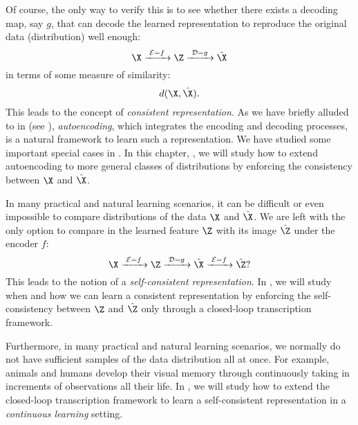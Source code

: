 \documentclass[../../book-main.tex]{subfiles}
\begin{document}
Of course, the only way to verify this is to see whether there exists a decoding map, say $g$, that can decode the learned representation to reproduce the original data (distribution) well enough:
\begin{equation}
  \X
  \xrightarrow{\hspace{1mm} \mathcal{E} = f \hspace{1mm}} \Z
  \xrightarrow{\hspace{1mm} \mathcal{D} = g \hspace{1mm}} \hat{\X}
\end{equation}
in terms of some measure of similarity:
\begin{equation}
  d(\X, \hat \X).
\end{equation}
This leads to the concept of {\em consistent representation}. As we have briefly alluded to in
 (see ), {\em autoencoding}, which integrates the
encoding and decoding processes, is a natural framework to learn such a representation. We have studied some important special cases in . In
this chapter, , we will study how to extend autoencoding to more general classes of distributions by enforcing the consistency between $\X$ and $\hat \X$.

In many practical and natural learning scenarios, it can be difficult or even impossible to compare distributions of the data $\X$ and $\hat \X$. We are left with the only option to compare in the learned feature $\Z$ with its image $\hat \Z$ under the encoder $f$: 
\begin{equation}
 \X
\xrightarrow{\hspace{1mm} \mathcal{E} = f \hspace{1mm}} \Z  \xrightarrow{\hspace{1mm} \mathcal{D} = g \hspace{1mm}} \hat{\X} \xrightarrow{\hspace{1mm} \mathcal{E} = f \hspace{1mm}} \hat \Z?
\end{equation}
This leads to the notion of a {\em self-consistent representation}. In , we will study when and how we can learn a consistent representation by enforcing the self-consistency between $\Z$ and $\hat \Z$ only through a closed-loop transcription framework. 

Furthermore, in many practical and natural learning scenarios, we normally do not have sufficient samples of the data distribution all at once. For example, animals and humans develop their visual memory through continuously taking in increments of observations all their life. In , we will study how to extend the closed-loop transcription framework to learn a self-consistent representation in a  {\em continuous learning} setting.
\end{document}
